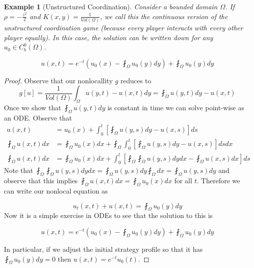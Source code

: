 \documentclass[aps,
preprint,
groupedaddress,
showkeys,
amsmath]{revtex4-2}
\newtheorem{example}{Example}
\begin{document}
    \begin{example}[Unstructured Coordination]\label{EX:UnstructuredCoord}
    Consider a bounded domain $\Omega$. If $\rho=-\frac{z^2}{2}$ and $K(x,y)=\frac{1}{Vol(\Omega)}$, we call this the continuous version of the unstructured coordination game (because every player interacts with every other player equally). In this case, the solution can be written down for any $u_0\in C^0_b(\Omega)$.
    
   \[u(x,t)=e^{-t}\left(u_0(x)-\fint_\Omega u_0(y)dy\right)+\fint_\Omega u_0(y)dy\] 
    
    \end{example}
    \begin{proof}
        Observe that our nonlocallity $g$ reduces to 
        \begin{equation*}
            g[u]=\frac{1}{Vol(\Omega)}\int_\Omega u(y,t)-u(x,t)dy=\fint_\Omega u(y,t)dy-u(x,t)
        \end{equation*}
        Once we show that $\fint_\Omega u(y,t)dy$ is constant in time we can solve point-wise as an ODE. Observe that 
        \begin{equation*}
        \begin{split} 
            u(x,t)&=u_0(x)+\int_0^t \left[\fint_\Omega u(y,s)dy-u(x,s)\right]ds\\
            \fint_\Omega u(x,t)dx&=\fint_\Omega u_0(x)dx+\fint_\Omega\int_0^t\left[\fint_\Omega u(y,s)dy-u(x,s)\right]dsdx\\
           \fint_\Omega u(x,t)dx&=\fint_\Omega u_0(x)dx +\int_0^t \left[\fint_\Omega \fint_\Omega u(y,s)dydx-\fint_\Omega u(x,s)dx\right]ds
            \end{split}
        \end{equation*}
        Note that $\fint_\Omega \fint_\Omega u(y,s)dydx=\fint_\Omega u(y,s)dy\fint_\Omega dx=\fint_\Omega u(y,s)dy$ and observe that this implies $\fint_\Omega u(x,t)dx=\fint_\Omega u_0(x)dx$ for all $t$. Therefore we can write our nonlocal equation as
        
       \[u_t(x,t)+u(x,t)=\fint_\Omega u_0(y)dy\] 
        Now it is a simple exercise in ODEs to see that the solution to this is 
        
       \[u(x,t)=e^{-t}\left( u_0(x)-\fint_\Omega u_0(y)dy\right)+\fint_\Omega u_0(y)dy\]

        In particular, if we adjust the initial strategy profile so that it has $\fint_\Omega u_0(y)dy=0$ then $u(x,t)=e^{-t}u_0(t)$. 
    \end{proof}
\end{document}
